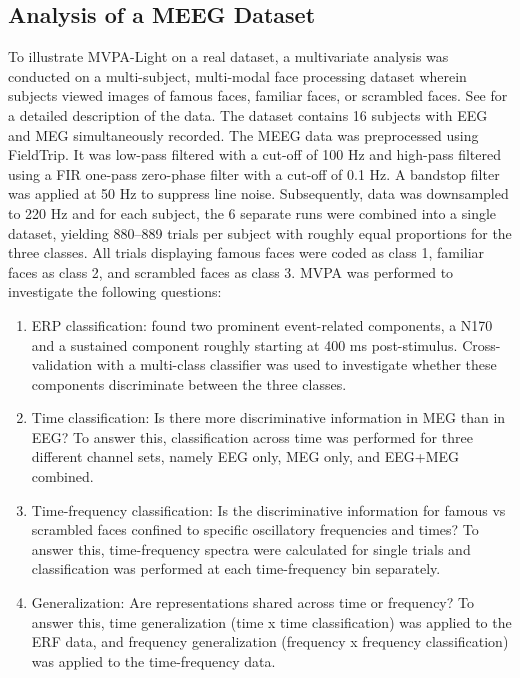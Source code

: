 \documentclass[utf8]{frontiersSCNS} %
\begin{document}
\subsection{Analysis of a MEEG Dataset}

To illustrate MVPA-Light on a real dataset, a multivariate analysis was conducted on a multi-subject, multi-modal face processing dataset wherein subjects viewed images of famous faces, familiar faces, or scrambled faces. See  \cite{Wakeman2014OpenfMRI,Wakeman2015ADataset} for a detailed description of the data. The dataset contains 16 subjects with EEG and MEG simultaneously recorded. The MEEG data was preprocessed using FieldTrip. It was low-pass filtered with a cut-off of 100 Hz and high-pass filtered using a FIR one-pass zero-phase filter with a cut-off of 0.1 Hz. A bandstop filter was applied at 50 Hz to suppress line noise. Subsequently, data was downsampled to 220 Hz and for each subject, the 6 separate runs were combined into a single dataset, yielding 880--889 trials per subject with roughly equal proportions for the three classes. All trials displaying famous faces were coded as class 1, familiar faces as class 2, and scrambled faces as class 3. MVPA was performed to investigate the following questions:

\begin{enumerate}
    \item ERP classification: \cite{Wakeman2015ADataset} found two prominent event-related components, a N170 and a sustained component roughly starting at 400 ms post-stimulus. Cross-validation with a multi-class classifier was used to investigate whether these components discriminate between the three classes.
    \item Time classification: Is there more discriminative information in MEG than in EEG? To answer this, classification across time was performed for three different channel sets, namely EEG only, MEG only, and EEG+MEG combined.
    \item Time-frequency classification: Is the discriminative information for famous vs scrambled faces confined to specific oscillatory frequencies and times? To answer this, time-frequency spectra were calculated for single trials and classification was performed at each time-frequency bin separately.
    \item Generalization: Are representations shared across time \citep{King2014} or frequency? To answer this, time generalization (time x time classification) was applied to the ERF data, and frequency generalization (frequency x frequency classification) was applied to the time-frequency data.
\end{enumerate}
\end{document}
